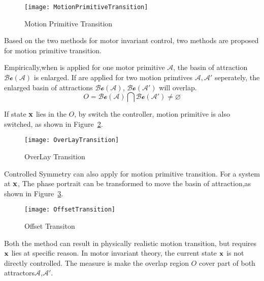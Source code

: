 \begin{figure}[!htbp]
  \begin{center}
      \texttt{[image: MotionPrimitiveTransition]}
    \caption{Motion Primitive Transition}
    \label{fig:motion-transition}
  \end{center}
\end{figure}


Based on the two methods for motor invariant control, two methods are proposed for motion primitive transition.
\begin{itemize}
Empirically,when \cpg is applied for one motor primitive $\mathcal{A}$, the basin of attraction $\mathcal{Bo}(\mathcal{A})$ is enlarged.
If \cpg are applied for two motion primtives $\mathcal{A,A'}$ seperately, the enlarged basin of attractions $\mathcal{Bo}(\mathcal{A})$,
$\mathcal{Bo}(\mathcal{A'})$ will overlap.
\[
O =
\mathcal{Bo}(\mathcal{A}) 
\bigcap \mathcal{Bo}(\mathcal{A'}) 
\neq \varnothing
\]
 
If  state $\mathbf{x}$ lies in the $O$, by switch the \cpg controller, motion primitive is also switched, as shown in Figure~\ref{fig:motion-overlay}.


\begin{figure}[!htbp]
  \begin{center}
      \texttt{[image: OverLayTransition]}
    \caption{OverLay Transition}
    \label{fig:motion-overlay}
  \end{center}
\end{figure}


Controlled Symmetry can also apply for motion primitive transition.
For a system at $\mathbf{x}$,  The phase portrait can be transformed to move the basin of attraction,as shown in Figure~\ref{fig:transform-offset}.


\begin{figure}[!htbp]
  \begin{center}
      \texttt{[image: OffsetTransition]}
    \caption{Offset Transiton}
    \label{fig:transform-offset}
  \end{center}
\end{figure}
\end{itemize}




Both the method can result in physically realistic motion transition, but requires $\mathbf{x}$ lies at specific reason.
In motor invariant theory, the current state $\mathbf{x}$ is not directly controlled.
The measure is make the overlap region $O$ cover part of both attractors$\mathcal{A}$,$\mathcal{A'}$.

